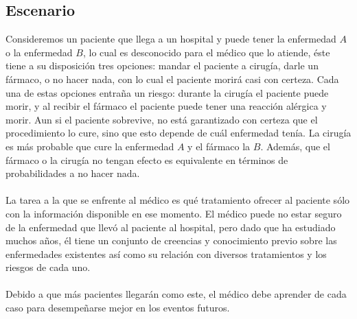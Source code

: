 \documentclass[11pt]{article}
\theoremstyle{plain}
\begin{document}
\subsection{Escenario}
Consideremos un paciente que llega a un hospital y puede tener la enfermedad $A$ o la enfermedad $B$, lo cual es desconocido para el médico que lo atiende, éste tiene a su disposición tres opciones: mandar el paciente a cirugía, darle un fármaco, o no hacer nada, con lo cual el paciente morirá casi con certeza. Cada una de estas opciones entraña un riesgo: durante la cirugía el paciente puede morir, y al recibir el fármaco el paciente puede tener una reacción alérgica y morir. Aun si el paciente sobrevive, no está garantizado con certeza que el procedimiento lo cure, sino que esto depende de cuál enfermedad tenía. La cirugía es más probable que cure la enfermedad $A$ y el fármaco la $B$. Además, que el fármaco o la cirugía no tengan efecto es equivalente en términos de probabilidades a no hacer nada.\\
\\
\indent La tarea a la que se enfrente al médico es qué tratamiento ofrecer al paciente sólo con la información disponible en ese momento. El médico puede no estar seguro de la enfermedad que llevó al paciente al hospital, pero dado que ha estudiado muchos años, él tiene un conjunto de creencias y conocimiento previo sobre las enfermedades existentes así como su relación con diversos tratamientos y los riesgos de cada uno.\\
\\
\indent Debido a que más pacientes llegarán como este, el médico debe aprender de cada caso para desempeñarse mejor en los eventos futuros. 
\end{document}
